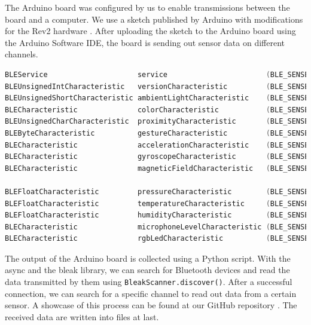 \documentclass{article}
\begin{document}
The Arduino board was configured by us to enable transmissions between the board and a computer. We use a sketch published by Arduino with modifications for the Rev2 hardware \cite{arduinoSketch}. After uploading the sketch to the Arduino board using the Arduino Software IDE, the board is sending out sensor data on different channels.

\begin{lstlisting}[language=C, frame=single, breaklines=true]
BLEService                     service                       (BLE_SENSE_UUID("0000"));
BLEUnsignedIntCharacteristic   versionCharacteristic         (BLE_SENSE_UUID("1001"), BLERead);
BLEUnsignedShortCharacteristic ambientLightCharacteristic    (BLE_SENSE_UUID("2001"), BLENotify); // 16-bit
BLECharacteristic              colorCharacteristic           (BLE_SENSE_UUID("2002"), BLENotify, 3 * sizeof(unsigned short)); // Array of 16-bit, RGB
BLEUnsignedCharCharacteristic  proximityCharacteristic       (BLE_SENSE_UUID("2003"), BLENotify); // Byte, 0 - 255 => close to far
BLEByteCharacteristic          gestureCharacteristic         (BLE_SENSE_UUID("2004"), BLENotify); // NONE = -1, UP = 0, DOWN = 1, LEFT = 2, RIGHT = 3
BLECharacteristic              accelerationCharacteristic    (BLE_SENSE_UUID("3001"), BLENotify, 3 * sizeof(float)); // Array of 3 floats, G
BLECharacteristic              gyroscopeCharacteristic       (BLE_SENSE_UUID("3002"), BLENotify, 3 * sizeof(float)); // Array of 3 floats, dps
BLECharacteristic              magneticFieldCharacteristic   (BLE_SENSE_UUID("3003"), BLENotify, 3 * sizeof(float)); // Array of 3 floats, uT

BLEFloatCharacteristic         pressureCharacteristic        (BLE_SENSE_UUID("4001"), BLERead); // Float, kPa
BLEFloatCharacteristic         temperatureCharacteristic     (BLE_SENSE_UUID("4002"), BLERead); // Float, Celcius
BLEFloatCharacteristic         humidityCharacteristic        (BLE_SENSE_UUID("4003"), BLERead); // Float, Percentage
BLECharacteristic              microphoneLevelCharacteristic (BLE_SENSE_UUID("5001"), BLENotify, 32); // Int, RMS of audio input
BLECharacteristic              rgbLedCharacteristic          (BLE_SENSE_UUID("6001"), BLERead | BLEWrite, 3 * sizeof(byte)); // Array of 3 bytes, RGB
\end{lstlisting}

The output of the Arduino board is collected using a Python script. With the async and the bleak library, we can search for Bluetooth devices and read the data transmitted by them using \texttt{BleakScanner.discover()}. After a successful connection, we can search for a specific channel to read out data from a certain sensor. A showcase of this process can be found at our GitHub repository \cite{getGyro}. The received data are written into files at last.
\end{document}
